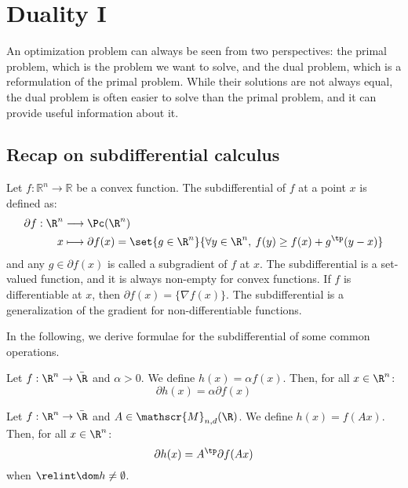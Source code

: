 \section{Duality I}
An optimization problem can always be seen from two perspectives: the primal problem, which is the problem we want to solve, and the dual problem, which is a reformulation of the primal problem. While their solutions are not always equal, the dual problem is often easier to solve than the primal problem, and it can provide useful information about it.
\subsection{Recap on subdifferential calculus}
Let $f:\mathbb{R}^n\to\mathbb{R}$ be a convex function. The subdifferential of $f$ at a point $x$ is defined as:
\begin{align*}
    \partial f : \R^n &\longrightarrow \Pc(\R^n)\\
    x &\longmapsto \partial f(x) = \set{g\in\R^n}{\forall y\in\R^n, \: f(y)\geq f(x)+g^\tp(y-x)}
\end{align*}
and any $g\in\partial f(x)$ is called a subgradient of $f$ at $x$. The subdifferential is a set-valued function, and it is always non-empty for convex functions. If $f$ is differentiable at $x$, then $\partial f(x) = \{\nabla f(x)\}$. The subdifferential is a generalization of the gradient for non-differentiable functions.

In the following, we derive formulae for the subdifferential of some common operations.

\begin{property}
    Let $f:\R^n\to\bar{\R}$ and $\alpha>0$. We define $h(x)=\alpha f(x)$. Then, for all $x\in\R^n$:
    \begin{equation*}
        \partial h(x) = \alpha\partial f(x)
    \end{equation*}
\end{property}

\begin{property}
    Let $f:\R^n\to\bar{\R}$ and $A\in\mathscr{M}_{n, d}(\R)$. We define $h(x)=f(Ax)$. Then, for all $x\in\R^n$:
    \begin{equation*}
        \partial h(x) = A^\tp\partial f(Ax)
    \end{equation*}
    when $\relint\dom h\neq\emptyset$.
\end{property}

